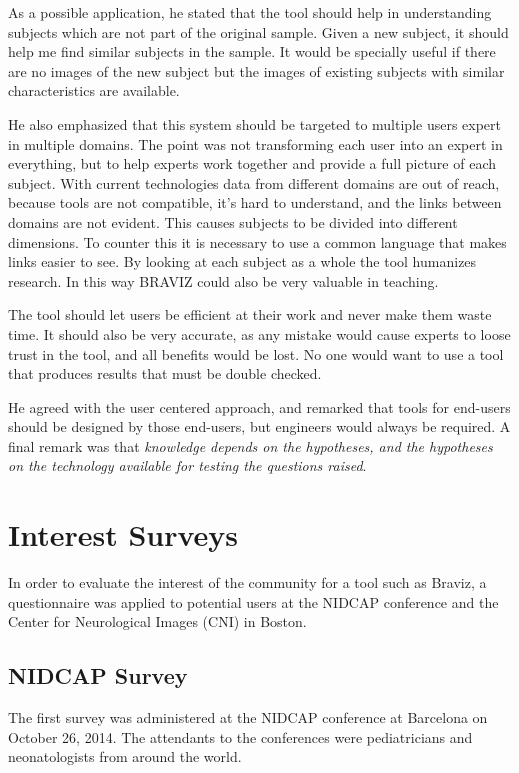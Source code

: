 As a possible application, he stated that the tool should help in understanding subjects which are not part of the original sample. Given a new subject, it should help me find similar subjects in the sample. It would be specially useful if there are no images of the new subject but the images of existing subjects with similar characteristics are available. 

He also emphasized that this system should be targeted to multiple users expert in multiple domains. The point was not transforming each user into an expert in everything, but to help experts work together and provide a full picture of each subject. With current technologies data from different domains are out of reach, because tools are not compatible, it's hard to understand, and the links between domains are not evident. This causes subjects to be divided into different dimensions. To counter this it is necessary to use a common language that makes links easier to see. By looking at each subject as a whole the tool humanizes research. In this way BRAVIZ could also be very valuable in teaching. 

The tool should let users be efficient at their work and never make them waste time. It should also be very accurate, as any mistake would cause experts to loose trust in the tool, and all benefits would be lost. No one would want to use a tool that produces results that must be double checked.

He agreed with the user centered approach, and remarked that tools for end-users should be designed by those end-users, but engineers would always be required.
A final remark was that \emph{knowledge depends on the hypotheses, and the hypotheses on the technology available for testing the questions raised}. 

\section{Interest Surveys}

In order to evaluate the interest of the community for a tool such as Braviz, a questionnaire was applied to potential users at the NIDCAP conference and the Center for Neurological Images (CNI) in Boston.

\subsection{NIDCAP Survey}

The first survey was administered at the NIDCAP conference at Barcelona on October 26, 2014. The attendants to the conferences were pediatricians and neonatologists from around the world. 

